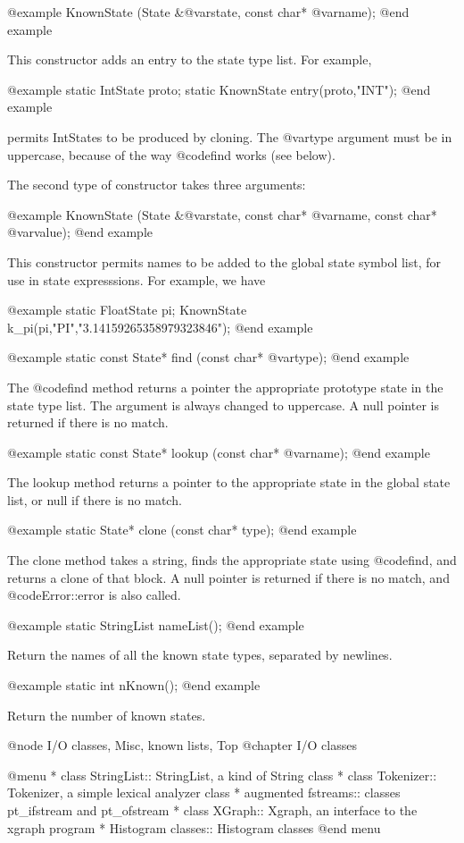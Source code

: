@example
KnownState (State &@var{state}, const char* @var{name});
@end example

This constructor adds an entry to the state type list.  For example,

@example
static IntState proto;
static KnownState entry(proto,"INT");
@end example

permits IntStates to be produced by cloning.  The @var{type} argument
must be in uppercase, because of the way @code{find} works (see below).

The second type of constructor takes three arguments:

@example
KnownState (State &@var{state}, const char* @var{name}, const char* @var{value});
@end example

This constructor permits names to be added to the global state symbol
list, for use in state expresssions.  For example, we have

@example
static FloatState pi;
KnownState k_pi(pi,"PI","3.14159265358979323846");
@end example

@example
static const State* find (const char* @var{type});
@end example

The @code{find} method returns a pointer the appropriate prototype
state in the state type list.  The argument is always changed to
uppercase.  A null pointer is returned if there is no match.

@example
static const State* lookup (const char* @var{name});
@end example

The lookup method returns a pointer to the appropriate state in
the global state list, or null if there is no match.

@example
static State* clone (const char* type);
@end example

The clone method takes a string, finds the appropriate state using
@code{find}, and returns a clone of that block.  A null pointer is
returned if there is no match, and @code{Error::error} is also called.

@example
static StringList nameList();
@end example

Return the names of all the known state types, separated by newlines.

@example
static int nKnown();
@end example

Return the number of known states.

@node I/O classes, Misc, known lists, Top
@chapter I/O classes

@menu
* class StringList::            StringList, a kind of String class
* class Tokenizer::             Tokenizer, a simple lexical analyzer class
* augmented fstreams::          classes pt_ifstream and pt_ofstream
* class XGraph::                Xgraph, an interface to the xgraph program
* Histogram classes::           Histogram classes
@end menu

